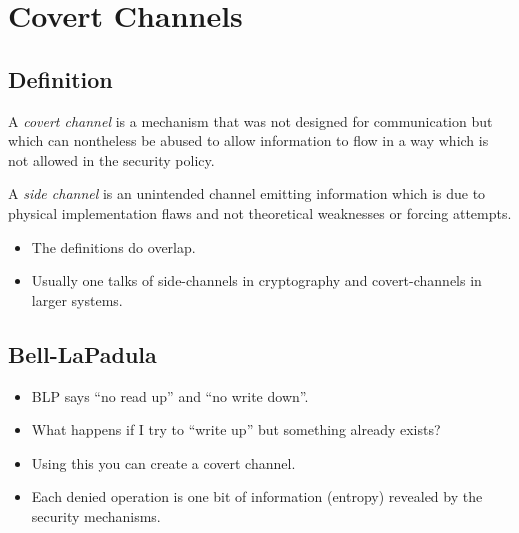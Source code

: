 \documentclass{beamer}
\begin{document}
\section{Covert Channels}

\subsection{Definition}

\begin{frame}
  \begin{definition}
    A \emph{covert channel} is a mechanism that was not designed for 
    communication but which can nontheless be abused to allow information to 
    flow in a way which is not allowed in the security policy.
  \end{definition}
  \begin{definition}
    A \emph{side channel} is an unintended channel emitting information which 
    is due to physical implementation flaws and not theoretical weaknesses or 
    forcing attempts.
  \end{definition}
\end{frame}

\begin{frame}
  \begin{itemize}
    \item The definitions do overlap.

    \item Usually one talks of side-channels in cryptography and 
      covert-channels in larger systems.
  \end{itemize}
\end{frame}

\subsection{Bell-LaPadula}

\begin{frame}
  \begin{itemize}
    \item BLP says ``no read up'' and ``no write down''.

    \item What happens if I try to ``write up'' but something already exists?

    \item Using this you can create a covert channel.

    \item Each denied operation is one bit of information (entropy) revealed by 
      the security mechanisms.

  \end{itemize}
\end{frame}
\end{document}

